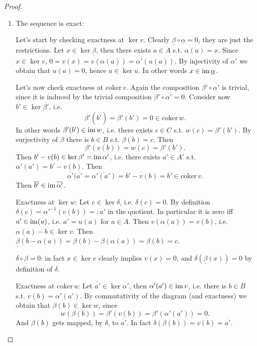 \documentclass[../Main]{subfiles}
\begin{document}
\begin{proof}
\begin{enumerate}
		\item The sequence is exact:

			Let's start by checking exactness at $\ker v$.
			Clearly $\underline{\beta} \circ \underline{\alpha} = 0$, they are just the restrictions.
			Let $x \in \ker \underline{\beta}$,
			then there exists $a \in A$ s.t. $\alpha(a) = x$.
			Since $x \in \ker v$, $0 = v(x) = v(\alpha(a)) = \alpha'(u(a))$,
			By injectivity of $\alpha'$ we obtain that $u(a) = 0$, hence $a \in \ker u$.
			In other words $x \in \operatorname{im} \underline{\alpha}$.

			Let's now check exactness at $\mathrm{coker}\, v$.
			Again the composition $\overline{\beta'} \circ \overline{\alpha'}$ is trivial,
			since it is induced by the trivial composition
			$\beta' \circ \alpha' = 0$.
			Consider now $\overline{b'} \in \ker \overline{\beta'}$, i.e.
			\begin{equation}
				\overline{\beta'}\left( \overline{b'} \right) =
				\overline{\beta'(b')} = 0 \in \mathrm{coker}\, w
			.\end{equation} 
			In other words $\beta'(b') \in \operatorname{im} w$, i.e. there exists
			$c \in C$ s.t. $w(c) = \beta'(b')$.
			By surjectivity of $\beta$ there is $b \in B$ s.t. $\beta(b) = c$.
			Then
			\begin{equation}
				\beta'(v(b)) = w(c) = \beta'(b')
			.\end{equation} 
			Then $b' - v(b) \in \ker \beta' = \operatorname{im} \alpha'$, i.e.
			there exists $a' \in A'$ s.t. $\alpha'(a') = b' - v(b)$.
			Then
			\begin{equation}
				\overline{\alpha'}(\overline{a'} =
				\overline{\alpha'(a')} = \overline{b' - v(b)} = \overline{b'}
				\in \mathrm{coker}\, v
			.\end{equation} 
			Then $\overline{b'} \in \operatorname{im} \overline{\alpha'}$.

			Exactness at $\ker w$:
			Let $c \in \ker \delta$, i.e. $\delta(c) = 0$.
			By definition $\delta(c) = \alpha'^{-1}(v(b)) =: a'$ in the quotient.
			In particular it is zero iff $a' \in \operatorname{im} (u)$, i.e. $a' = u(a)$
			for $a \in A$.
			Then $v(\alpha(a)) = v(b)$, i.e. $\alpha(a) - b \in \ker v$.
			Then $\underline{\beta}(b - \alpha(a)) = \beta(b) - \beta(\alpha(a)) = \beta(b) = c$.

			$\delta \circ \underline{\beta} = 0$: in fact $x \in \ker v$ clearly implies
			$v(x) = 0$, and $\delta(\underline{\beta}(x)) = 0$ by definition of $\delta$.

			Exactness at $\mathrm{coker}\, u$:
			Let $\overline{a'} \in \ker \overline{\alpha'}$, then
			$\alpha'(a') \in \operatorname{im} v$, i.e. there is $b \in B$ s.t. $v(b) = \alpha'(a')$.
			By commutativity of the diagram (and exactness) we obtain that $\beta(b) \in \ker w$,
			since
			\begin{equation}
				w(\beta(b)) = \beta'(v(b)) = \beta'(\alpha'(a')) = 0
			.\end{equation} 
			And $\beta(b)$ gets mapped, by $\delta$, to $\overline{a'}$.
			In fact $\delta(\beta(b)) = \overline{v(b)} = \overline{a'}$.\qedhere
	\end{enumerate}
\end{proof}
\end{document}
